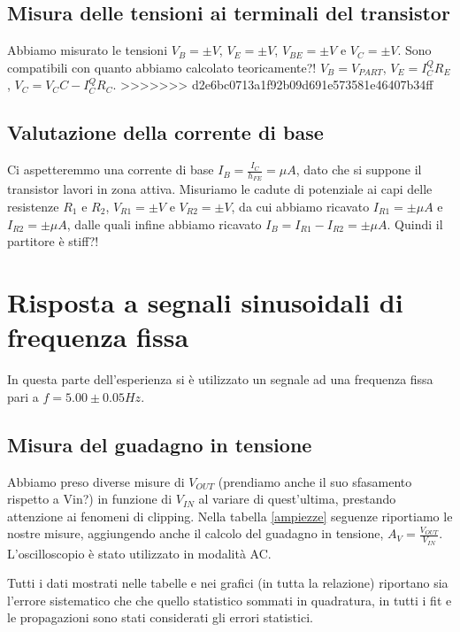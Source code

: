 \documentclass[10pt,a4paper]{article}
\begin{document}
\subsection{Misura delle tensioni ai terminali del transistor}
Abbiamo misurato le tensioni $V_B= \pm V$, $V_E= \pm V$, $V_{BE}= \pm V$ e $V_C= \pm V$. Sono compatibili con quanto abbiamo calcolato teoricamente?! $V_B= V_{PART}$, $V_E=I_C^Q R_E$, $V_C=V_CC-I_C^Q R_C$.
>>>>>>> d2e6bc0713a1f92b09d691e573581e46407b34ff

\subsection{Valutazione della corrente di base}
Ci aspetteremmo una corrente di base $I_B=\frac{I_C}{h_{FE}}= \mu A$, dato che si suppone il transistor lavori in zona attiva. Misuriamo le cadute di potenziale ai capi delle resistenze $R_1$ e $R_2$, $V_{R1}= \pm V$ e $V_{R2}= \pm V$, da cui abbiamo ricavato $I_{R1}= \pm \mu A$ e $I_{R2}= \pm \mu A$, dalle quali infine abbiamo ricavato $I_B=I_{R1}-I_{R2}= \pm \mu A$. Quindi il partitore è stiff?!

\section{Risposta a segnali sinusoidali di frequenza fissa}
In questa parte dell'esperienza si è utilizzato un segnale ad una frequenza fissa pari a $f= 5.00\pm0.05 Hz$.

\subsection{Misura del guadagno in tensione}
Abbiamo preso diverse misure di $V_{OUT}$ (prendiamo anche il suo sfasamento rispetto a Vin?) in funzione di $V_{IN}$ al variare di quest'ultima, prestando attenzione ai fenomeni di clipping. Nella tabella \ref{ampiezze} seguenze riportiamo le nostre misure, aggiungendo anche il calcolo del guadagno in tensione, $A_V=\frac{V_{OUT}}{V_{IN}}$.\\
L'oscilloscopio è stato utilizzato in modalità AC.

Tutti i dati mostrati nelle tabelle e nei grafici (in tutta la relazione) riportano sia l'errore sistematico che che quello statistico sommati in quadratura, in tutti i fit e le propagazioni sono stati considerati gli errori statistici.
\end{document}
